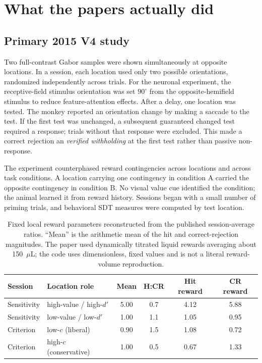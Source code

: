\documentclass[10pt]{article}
\begin{document}
\section{What the papers actually did}

\subsection{Primary 2015 V4 study}
Two full-contrast Gabor samples were shown simultaneously at opposite locations. In a session, each location used only two possible orientations, randomized independently across trials. For the neuronal experiment, the receptive-field stimulus orientation was set $90^\circ$ from the opposite-hemifield stimulus to reduce feature-attention effects. After a delay, one location was tested. The monkey reported an orientation change by making a saccade to the test. If the first test was unchanged, a subsequent guaranteed changed test required a response; trials without that response were excluded. This made a correct rejection an \emph{verified withholding} at the first test rather than passive non-response.

The experiment counterphased reward contingencies across locations and across task conditions. A location carrying one contingency in condition A carried the opposite contingency in condition B. No visual value cue identified the condition; the animal learned it from reward history. Sessions began with a small number of priming trials, and behavioral SDT measures were computed by test location.

\begin{table}[ht]
\centering
\small
\caption{Fixed local reward parameters reconstructed from the published session-average ratios. ``Mean'' is the arithmetic mean of the hit and correct-rejection magnitudes. The paper used dynamically titrated liquid rewards averaging about 150~$\mu$L; the code uses dimensionless, fixed values and is not a literal reward-volume reproduction.}
\begin{tabularx}{\linewidth}{@{}l l c c c c@{}}
\toprule
Session & Location role & Mean & H:CR & Hit reward & CR reward \\
\midrule
Sensitivity & high-value / high-$d'$ & 5.00 & 0.7 & 4.12 & 5.88 \\
Sensitivity & low-value / low-$d'$ & 1.00 & 1.1 & 1.05 & 0.95 \\
Criterion & low-$c$ (liberal) & 0.90 & 1.5 & 1.08 & 0.72 \\
Criterion & high-$c$ (conservative) & 1.00 & 0.5 & 0.67 & 1.33 \\
\bottomrule
\end{tabularx}
\end{table}
\end{document}
